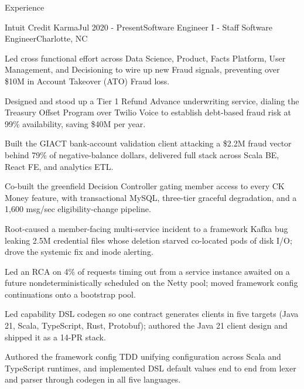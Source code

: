 \documentclass{resume} %
\begin{document}
\begin{rSection}{Experience}

\begin{rSubsection}{Intuit Credit Karma}{Jul 2020 - Present}{Software Engineer I - Staff Software Engineer}{Charlotte, NC}

\item Led cross functional effort across Data Science, Product, Facts Platform, User Management, and Decisioning to wire up new Fraud signals, preventing over \$10M in Account Takeover (ATO) Fraud loss.

\item Designed and stood up a Tier 1 Refund Advance underwriting service, dialing the Treasury Offset Program over Twilio Voice to establish debt-based fraud risk at 99\% availability, saving \$40M per year.

\item Built the GIACT bank-account validation client attacking a \$2.2M fraud vector behind 79\% of negative-balance dollars, delivered full stack across Scala BE, React FE, and analytics ETL.

\item Co-built the greenfield Decision Controller gating member access to every CK Money feature, with transactional MySQL, three-tier graceful degradation, and a 1,600 msg/sec eligibility-change pipeline.

\item Root-caused a member-facing multi-service incident to a framework Kafka bug leaking 2.5M credential files whose deletion starved co-located pods of disk I/O; drove the systemic fix and inode alerting.

\item Led an RCA on 4\% of requests timing out from a service instance awaited on a future nondeterministically scheduled on the Netty pool; moved framework config continuations onto a bootstrap pool.

\item Led capability DSL codegen so one contract generates clients in five targets (Java 21, Scala, TypeScript, Rust, Protobuf); authored the Java 21 client design and shipped it as a 14-PR stack.

\item Authored the framework config TDD unifying configuration across Scala and TypeScript runtimes, and implemented DSL default values end to end from lexer and parser through codegen in all five languages.


\end{rSubsection}
\end{rSection}
\end{document}
